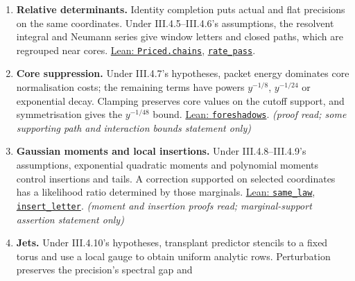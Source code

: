 \documentclass[
  letterpaper,
  11pt]{article}
\begin{document}
\begin{enumerate}
  \href{https://github.com/yang-mills-group/OpenAI-YM-20261028/blob/3456e5e75cf8d4cd558955a5c7638fba2d68f464/YM/SectorNext/GAUSSIAN_SECTOR_CHANGE/Handoff.lean\#L132-L182}{\texttt{committed}}.
\item
  \textbf{Relative determinants.} Identity completion puts actual and
  flat precisions on the same coordinates. Under III.4.5--III.4.6's
  assumptions, the resolvent integral and Neumann series give window
  letters and closed paths, which are regrouped near cores.
  \href{https://github.com/yang-mills-group/OpenAI-YM-20261028/blob/3456e5e75cf8d4cd558955a5c7638fba2d68f464/YM/AnalyticBridge/RELATIVE_LOGDET_TRACE/Series.lean\#L203-L227}{Lean:
  \texttt{Priced.chains}},
  \href{https://github.com/yang-mills-group/OpenAI-YM-20261028/blob/3456e5e75cf8d4cd558955a5c7638fba2d68f464/YM/PhysicalNext/AFTERNOON_INTERACTING_RANK_COMPARISON/Opacity/Enigma.lean\#L36-L48}{\texttt{rate\_pass}}.
\item
  \textbf{Core suppression.} Under III.4.7's hypotheses, packet energy
  dominates core normalisation costs; the remaining terms have powers
  \(y^{-1/8}\), \(y^{-1/24}\) or exponential decay. Clamping preserves
  core values on the cutoff support, and symmetrisation gives the
  \(y^{-1/48}\) bound.
  \href{https://github.com/yang-mills-group/OpenAI-YM-20261028/blob/3456e5e75cf8d4cd558955a5c7638fba2d68f464/YM/PhysicalNext/AFTERNOON_INTERACTING_RANK_COMPARISON/Opacity/Gush.lean\#L96-L134}{Lean:
  \texttt{foreshadows}}. \emph{(proof read; some supporting path and
  interaction bounds statement only)}
\item
  \textbf{Gaussian moments and local insertions.} Under
  III.4.8--III.4.9's assumptions, exponential quadratic moments and
  polynomial moments control insertions and tails. A correction
  supported on selected coordinates has a likelihood ratio determined by
  those marginals.
  \href{https://github.com/yang-mills-group/OpenAI-YM-20261028/blob/3456e5e75cf8d4cd558955a5c7638fba2d68f464/YM/AnalyticBridge/ANNULUS_RATIO_INSERTIONS/Arc.lean\#L189-L253}{Lean:
  \texttt{same\_law}},
  \href{https://github.com/yang-mills-group/OpenAI-YM-20261028/blob/3456e5e75cf8d4cd558955a5c7638fba2d68f464/YM/SectorTools/PHYSICAL_GAUSSIAN_INSERTION/Insertion.lean\#L120-L172}{\texttt{insert\_letter}}.
  \emph{(moment and insertion proofs read; marginal-support assertion
  statement only)}
\item
  \textbf{Jets.} Under III.4.10's hypotheses, transplant predictor
  stencils to a fixed torus and use a local gauge to obtain uniform
  analytic rows. Perturbation preserves the precision's spectral gap and

\end{enumerate}
\end{document}
